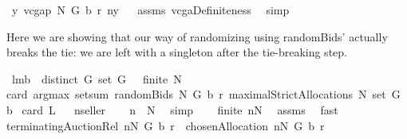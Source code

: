 \begin{isabellebody}
{\isachardoublequoteopen}{\isasymexists}{\isacharbang}\ y{\isachardot}\ vcgap\ N\ G\ b\ r\ n{\isacharequal}y{\isachardoublequoteclose}%
\isadelimproof
\ %
\endisadelimproof
%
\isatagproof
{}\isamarkupfalse%
\ assms\ vcgaDefiniteness\ \isamarkupfalse%
\ simp%
\endisatagproof
{\isafoldproof}%
%
\isadelimproof
%
\endisadelimproof
%
\begin{isamarkuptext}%
Here we are showing that our way of randomizing using randomBids' actually breaks the tie:
we are left with a singleton after the tie-breaking step.%
\end{isamarkuptext}%
\isamarkuptrue%
\isamarkupfalse%
\ lm{}{}b{\isacharcolon}\ \ {\isachardoublequoteopen}distinct\ G{\isachardoublequoteclose}\ {\isachardoublequoteopen}set\ G\ {\isasymnoteq}\ {\isacharbraceleft}{\isacharbraceright}{\isachardoublequoteclose}\ {\isachardoublequoteopen}finite\ N{\isachardoublequoteclose}\ \ \isanewline
{\isachardoublequoteopen}card\ {\isacharparenleft}argmax\ {\isacharparenleft}setsum\ {\isacharparenleft}randomBids{\isacharprime}\ N\ G\ b\ r{\isacharparenright}{\isacharparenright}\ {\isacharparenleft}maximalStrictAllocations{\isacharprime}\ N\ {\isacharparenleft}set\ G{\isacharparenright}\ b{\isacharparenright}{\isacharparenright}{\isacharequal}{}{\isachardoublequoteclose}\isanewline
{\isacharparenleft}\ {\isachardoublequoteopen}card\ {\isacharquery}L{\isacharequal}{\isacharunderscore}{\isachardoublequoteclose}{\isacharparenright}\isanewline
%
\isadelimproof
\isanewline
%
\endisadelimproof
%
\isatagproof
{}\isamarkupfalse%
\ {\isacharminus}\isanewline
{}\isamarkupfalse%
\ {\isacharquery}n{\isacharequal}{\isachardoublequoteopen}{\isacharbraceleft}seller{\isacharbraceright}{\isachardoublequoteclose}\ \isamarkupfalse%
\ \isanewline
{}{\isacharcolon}\ {\isachardoublequoteopen}{\isacharparenleft}{\isacharquery}n\ {\isasymunion}\ N{\isacharparenright}{\isasymnoteq}{\isacharbraceleft}{\isacharbraceright}{\isachardoublequoteclose}\ \isamarkupfalse%
\ simp\ \isamarkupfalse%
\ \isanewline
{}{\isacharcolon}\ {\isachardoublequoteopen}finite\ {\isacharparenleft}{\isacharquery}n{\isasymunion}N{\isacharparenright}{\isachardoublequoteclose}\ \isamarkupfalse%
\ assms{\isacharparenleft}{}{\isacharparenright}\ \isamarkupfalse%
\ fast\ \isamarkupfalse%
\ \isanewline
{\isachardoublequoteopen}terminatingAuctionRel\ {\isacharparenleft}{\isacharquery}n{\isasymunion}N{\isacharparenright}\ G\ b\ r\ {\isacharequal}\ {\isacharbraceleft}chosenAllocation{\isacharprime}\ {\isacharparenleft}{\isacharquery}n{\isasymunion}N{\isacharparenright}\ G\ b\ r{\isacharbraceright}{\isachardoublequoteclose}\ \isamarkupfalse%

\end{isabellebody}
